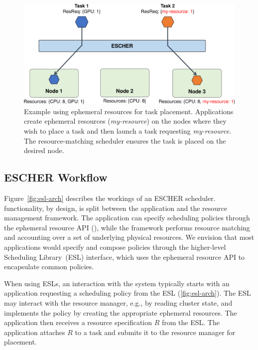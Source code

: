 \begin{figure}[t]
    \centering
    \includegraphics[width=0.92\linewidth]{escher/figures/logicalres_demo.pdf}
    \caption{\small Example using ephemeral resources for task placement. Applications create ephemeral resources (\emph{my-resource}) on the nodes where they wish to place a task and then launch a task requesting \emph{my-resource}. The resource-matching scheduler ensures the task is placed on the desired node.}
    \label{fig:er-example}
    \vspace{-4mm}
\end{figure}

\subsection{ESCHER Workflow}
\label{sec:arch:design}

Figure~\ref{fig:esl-arch} describes the workings of an ESCHER scheduler. %
\name{} functionality, by design, is split between the application and the resource management framework.
The application can specify scheduling policies through the ephemeral resource API (), while the framework performs resource matching and accounting over a set of underlying physical resources.
We envision that most applications would specify and compose policies through the higher-level \name{} Scheduling Library~(ESL) interface, which uses the ephemeral resource API to encapsulate common policies.

When using ESLs, an interaction with the system typically starts with an application requesting a scheduling policy from the ESL (\cref{fig:esl-arch}).
The ESL may interact with the resource manager, e.g., by reading cluster state, and implements the policy by creating the appropriate ephemeral resources.
The application then receives a resource specification $R$ from the ESL.
The application attaches $R$ to a task and submits it to the resource manager for placement.

